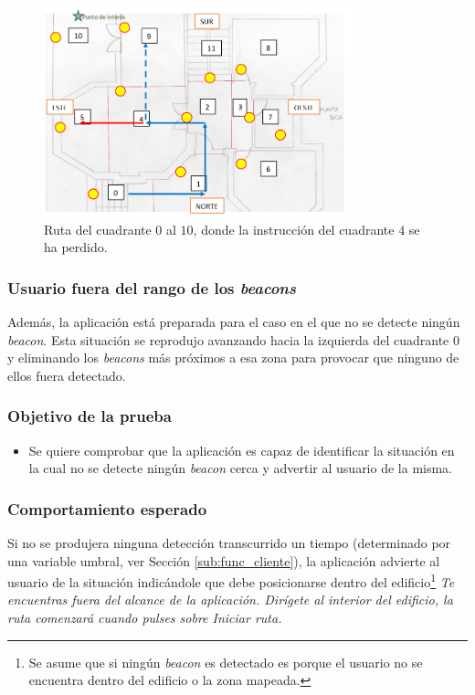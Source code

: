 \begin{figure}[t!]
	\centering
	\includegraphics[width=0.8\textwidth]{Imagenes/Evaluacion/del0al10sin4perdido}
	\caption{Ruta del cuadrante $0$ al $10$, donde la instrucción del cuadrante $4$ se ha perdido.}
	\label{fig:del0al10sin4perdido}
\end{figure}


\subsubsection{Usuario fuera del rango de los \textit{beacons}}

Además, la aplicación está preparada para el caso en el que no se detecte ningún \textit{beacon}. Esta situación se reprodujo avanzando hacia la izquierda del cuadrante $0$ y eliminando los \textit{beacons} más próximos a esa zona para provocar que ninguno de ellos fuera detectado.

\subsubsection*{Objetivo de la prueba}

\begin{itemize}
	\item Se quiere comprobar que la aplicación es capaz de identificar la situación en la cual no se detecte ningún \textit{beacon} cerca y advertir al usuario de la misma. 
\end{itemize}

\subsubsection*{Comportamiento esperado}

 Si no se produjera ninguna detección transcurrido un tiempo (determinado por una variable umbral, ver Sección \ref{sub:func_cliente}), la aplicación advierte al usuario de la situación indicándole que debe posicionarse dentro del edificio\footnote{Se asume que si ningún \textit{beacon} es detectado es porque el usuario no se encuentra dentro del edificio o la zona mapeada.} \textit{Te encuentras fuera del alcance de la aplicación. Dirígete al interior del edificio, la ruta comenzará cuando pulses sobre Iniciar ruta.} 
 
